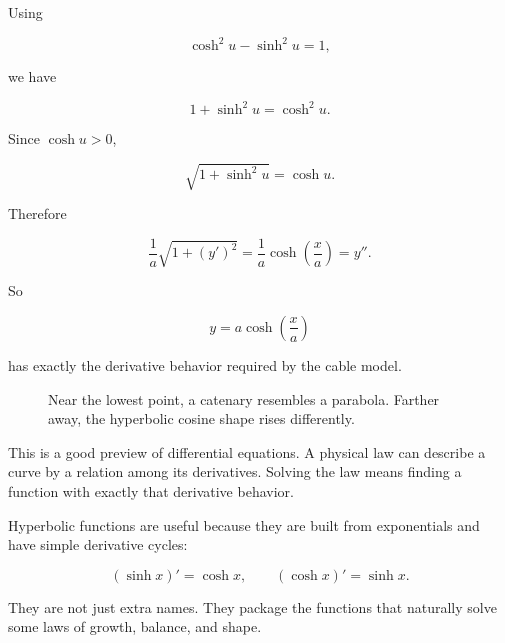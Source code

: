 Using

\[
\cosh^2 u-\sinh^2 u=1,
\]

we have

\[
1+\sinh^2u=\cosh^2u.
\]

Since \(\cosh u>0\),

\[
\sqrt{1+\sinh^2u}=\cosh u.
\]

Therefore

\[
\frac1a\sqrt{1+(y')^2}
=
\frac1a\cosh\left(\frac{x}{a}\right)
=
y''.
\]

So

\[
\boxed{
y=a\cosh\left(\frac{x}{a}\right)
}
\]

has exactly the derivative behavior required by the cable model.

\begin{figure}[h]
\centering
{}
\caption{Near the lowest point, a catenary resembles a parabola.  Farther away, the hyperbolic cosine shape rises differently.}
\label{fig:catenary-cosh}
\end{figure}

This is a good preview of differential equations.  A physical law can describe a curve by a relation among its derivatives.  Solving the law means finding a function with exactly that derivative behavior.

Hyperbolic functions are useful because they are built from exponentials and have simple derivative cycles:

\[
(\sinh x)'=\cosh x,
\qquad
(\cosh x)'=\sinh x.
\]

They are not just extra names.  They package the functions that naturally solve some laws of growth, balance, and shape.

